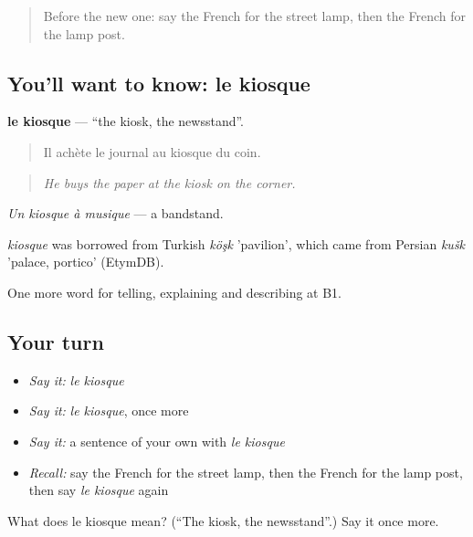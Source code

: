 \begin{quote}
Before the new one: say the French for the street lamp, then the French for the lamp post.
\end{quote}

\subsection*{You'll want to know: le kiosque}
\textbf{le kiosque} — \textquotedblleft{}the kiosk, the newsstand\textquotedblright{}.

\begin{quote}
Il achète le journal au kiosque du coin.
\end{quote}

\begin{quote}
\emph{He buys the paper at the kiosk on the corner.}
\end{quote}

\emph{Un kiosque à musique} — a bandstand.

\begin{cousinweb}
\emph{kiosque} was borrowed from Turkish \emph{köşk} 'pavilion', which came from Persian \emph{kušk} 'palace, portico' (EtymDB).
\end{cousinweb}

\begin{grammarlens}[title={What you've built}]
One more word for telling, explaining and describing at B1.
\end{grammarlens}

\subsection*{Your turn}
\begin{itemize}
\raggedright
  \item \emph{Say it:} \emph{le kiosque}
  \item \emph{Say it:} \emph{le kiosque}, once more
  \item \emph{Say it:} a sentence of your own with \emph{le kiosque}
  \item \emph{Recall:} say the French for the street lamp, then the French for the lamp post, then say \emph{le kiosque} again
\end{itemize}

\begin{tcolorbox}[breakable,colback=teal!4,colframe=teal!35!black,title={Before you move on}]
What does le kiosque mean? (\textquotedblleft{}The kiosk, the newsstand\textquotedblright{}.) Say it once more.
\end{tcolorbox}
